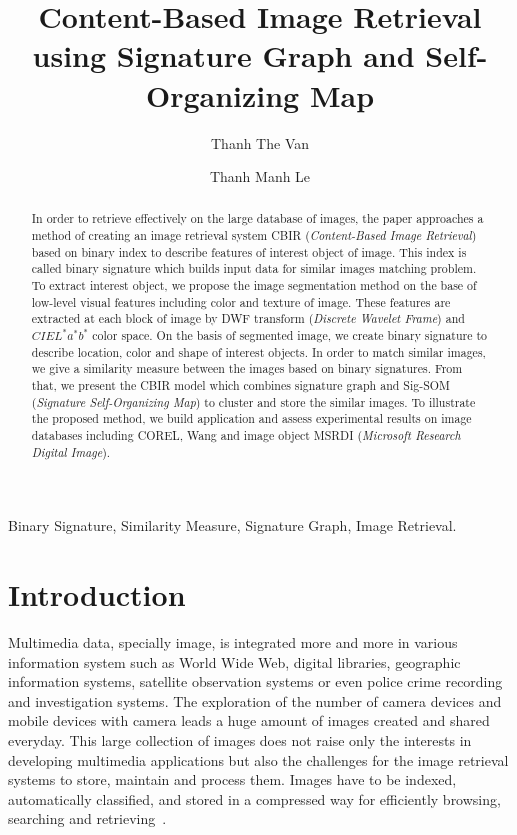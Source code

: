 \documentclass{amcs}
\title{Content-Based Image Retrieval using Signature Graph and Self-Organizing Map}
\author[ad1][ad2]{Thanh The Van}
\author[ad3][]{Thanh Manh Le}
\begin{document}
\begin{abstract}
In order to retrieve effectively on the large database of images, the paper approaches a method of creating an image retrieval system CBIR (\textit{Content-Based Image Retrieval}) based on binary index to describe features of interest object of image.
This index is called binary signature which builds input data for similar images matching problem. 
To extract interest object, we propose the image segmentation method on the base of low-level visual features including color and texture of image. 
These features are extracted at each block of image by DWF transform (\textit{Discrete Wavelet Frame}) and $CIE{L^*}{a^*}{b^*}$ color space.
On the basis of segmented image, we create binary signature to describe location, color and shape of interest objects. In order to match similar images, we give a similarity measure between the images based on binary signatures.
From that, we present the CBIR model which combines signature graph and Sig-SOM (\textit{Signature Self-Organizing Map}) to cluster and store the similar images.
To illustrate the proposed method, we build application and assess experimental results on image databases including COREL, Wang and image object MSRDI (\textit{Microsoft Research Digital Image}).

\end{abstract}
%
\begin{keywords}
Binary Signature, Similarity Measure, Signature Graph, Image Retrieval.
\end{keywords}
\maketitle

\section{Introduction}
\label{Introduction}
Multimedia data, specially image, is integrated more and more in various information system such as World Wide Web, digital libraries, geographic information systems, satellite observation systems or even police crime recording and investigation systems. The exploration of the number of camera devices and mobile devices with camera  leads a huge amount of images created and shared everyday. This large collection of images does not raise only  the interests in developing multimedia applications but also the challenges for the image retrieval systems to store, maintain and process them. Images have to be indexed, automatically classified, and  stored in a compressed way for efficiently browsing, searching and retrieving~\cite{}. 
\end{document}
